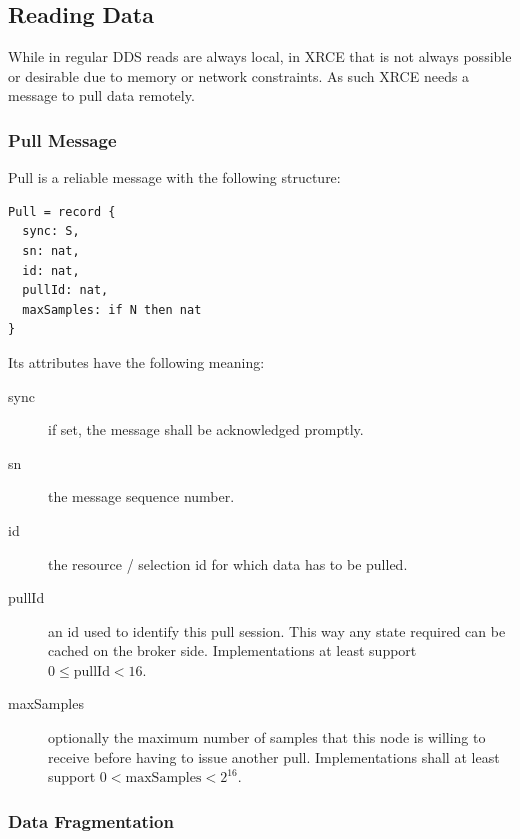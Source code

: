 \documentclass[a4paper,oneside,article]{memoir}
\begin{document}
\subsection{Reading Data}

While in regular DDS reads are always local, in XRCE that is not always possible or desirable
due to memory or network constraints.  As such XRCE needs a message to pull data remotely.

\subsubsection{Pull Message}
Pull is a reliable message with the following structure:
\begin{verbatim}
Pull = record {
  sync: S,
  sn: nat,
  id: nat,
  pullId: nat,
  maxSamples: if N then nat
}
\end{verbatim}
Its attributes have the following meaning:
\begin{description}
\item[sync] if set, the message shall be acknowledged promptly.
\item[sn] the message sequence number.
\item[id] the resource / selection id for which data has to be pulled.
\item[pullId] an id used to identify this pull session.  This way any state required can be cached
  on the broker side. Implementations at least support $0 ≤ \mathrm{pullId} < 16$.
\item[maxSamples] optionally the maximum number of samples that this node is willing to receive
  before having to issue another pull.  Implementations shall at least support
  $0 < \mathrm{maxSamples} < 2^{16}$.
\end{description}

\subsubsection{Data Fragmentation}
\end{document}
